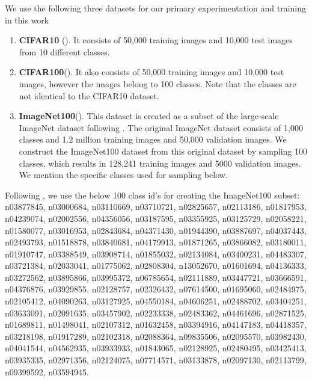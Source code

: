 We use the following three datasets for our primary experimentation and training in this work

\begin{enumerate}
\item \textbf{CIFAR10} (\citep{krizhevsky2009learning}). It consists of 50,000 training images and 10,000 test images from 10 different classes. 

\item \textbf{CIFAR100}(\citep{krizhevsky2009learning}). It also consists of 50,000 training images and 10,000 test images, however the images belong to 100 classes. Note that the classes are not identical to the CIFAR10 dataset.  

\item \textbf{ImageNet100}(\citep{imagenet}). This dataset is created as a subset of the large-scale ImageNet dataset following \citet{ming2022delving}. The original ImageNet dataset consists of 1,000 classes and 1.2 million training images and 50,000 validation images. We construct the ImageNet100 dataset from this original dataset by sampling 100 classes, which results in 128,241 training images and 5000 validation images. We mention the specific classes used for sampling below.
\end{enumerate} 

Following \citep{ming2022delving}, we use the below 100 class id's for creating the ImageNet100 subset: n03877845, n03000684, n03110669, n03710721, n02825657, n02113186, n01817953, n04239074, n02002556, n04356056, n03187595, n03355925, n03125729, n02058221, n01580077, n03016953, n02843684, n04371430, n01944390, n03887697, n04037443, n02493793, n01518878, n03840681, n04179913, n01871265, n03866082, n03180011, n01910747, n03388549, n03908714, n01855032, n02134084, n03400231, n04483307, n03721384, n02033041, n01775062, n02808304, n13052670, n01601694, n04136333, n03272562, n03895866, n03995372, n06785654, n02111889, n03447721, n03666591, n04376876, n03929855, n02128757, n02326432, n07614500, n01695060, n02484975, n02105412, n04090263, n03127925, n04550184, n04606251, n02488702, n03404251, n03633091, n02091635, n03457902, n02233338, n02483362, n04461696, n02871525, n01689811, n01498041, n02107312, n01632458, n03394916, n04147183, n04418357, n03218198, n01917289, n02102318, n02088364, n09835506, n02095570, n03982430, n04041544, n04562935, n03933933, n01843065, n02128925, n02480495, n03425413, n03935335, n02971356, n02124075, n07714571, n03133878, n02097130, n02113799, n09399592, n03594945.


